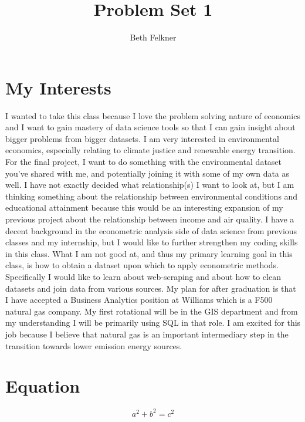 \documentclass{article}
\title{Problem Set 1}
\author{Beth Felkner}
\begin{document}
\maketitle

\section{My Interests}

I wanted to take this class because I love the problem solving nature of economics and I want to gain mastery of data science tools so that I can gain insight about bigger problems from bigger datasets. I am very interested in environmental economics, especially relating to climate justice and renewable energy transition. For the final project, I want to do something with the environmental dataset you've shared with me, and potentially joining it with some of my own data as well. I have not exactly decided what relationship(s) I want to look at, but I am thinking something about the relationship between environmental conditions and educational attainment because this would be an interesting expansion of my previous project about the relationship between income and air quality. I have a decent background in the econometric analysis side of data science from previous classes and my internship, but I would like to further strengthen my coding skills in this class. What I am not good at, and thus my primary learning goal in this class, is how to obtain a dataset upon which to apply econometric methods. Specifically I would like to learn about web-scraping and about how to clean datasets and join data from various sources. My plan for after graduation is that I have accepted a Business Analytics position at Williams which is a F500 natural gas company. My first rotational will be in the GIS department and from my understanding I will be primarily using SQL in that role. I am excited for this job because I believe that natural gas is an important intermediary step in the transition towards lower emission energy sources.

\section{Equation}
\[ a^2 + b^2 = c^2 \]
\end{document}
